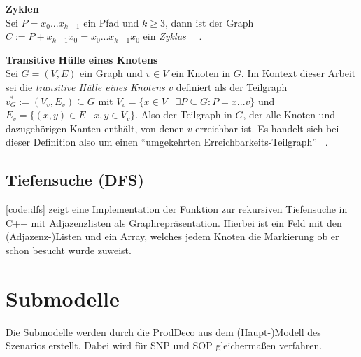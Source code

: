 \textbf{Zyklen} \\
Sei $P = x_0...x_{k-1}$ ein Pfad und $k \geq 3$, dann ist der Graph $C := P + x_{k-1}x_0 = x_0...x_{k-1}x_0$ ein \textit{Zyklus} ~\cite[S.~8]{Diestel.2016}~\cite[S.~475]{Sedgewick.1992}.


\textbf{Transitive Hülle eines Knotens} \\
Sei $G = (V, E)$ ein Graph und $v \in V$ ein Knoten in $G$. Im Kontext
 dieser Arbeit sei die \textit{transitive Hülle eines Knotens} $v$ definiert
  als der Teilgraph $v^*_G := (V_v, E_v) \subseteq G$ 
  mit $V_v = \{x \in V \mid \exists P \subseteq G: P=x...v\}$ 
  und $E_v = \{ (x,y) \in E \mid x,y \in V_v \}$. 
  Also der Teilgraph in $G$, der alle Knoten und dazugehörigen Kanten enthält, von denen $v$ erreichbar ist. Es handelt sich bei dieser Definition also um einen \enquote{umgekehrten Erreichbarkeits-Teilgraph} ~\cite[S.~41--42]{Sandner.01.09.1998}.



\subsection{Tiefensuche (DFS)}

\autoref{code:dfs} zeigt eine Implementation der Funktion zur rekursiven Tiefensuche in C++ mit Adjazenzlisten als Graphrepräsentation. Hierbei ist  ein Feld mit den (Adjazenz-)Listen und  ein Array, welches jedem Knoten die Markierung ob er schon besucht wurde zuweist.




\section{Submodelle} \label{sec:submodelle}

Die Submodelle werden durch die \ac{ProdDeco} aus dem (Haupt-)Modell des Szenarios erstellt. Dabei wird für \ac{SNP} und \ac{SOP} gleichermaßen verfahren. 


